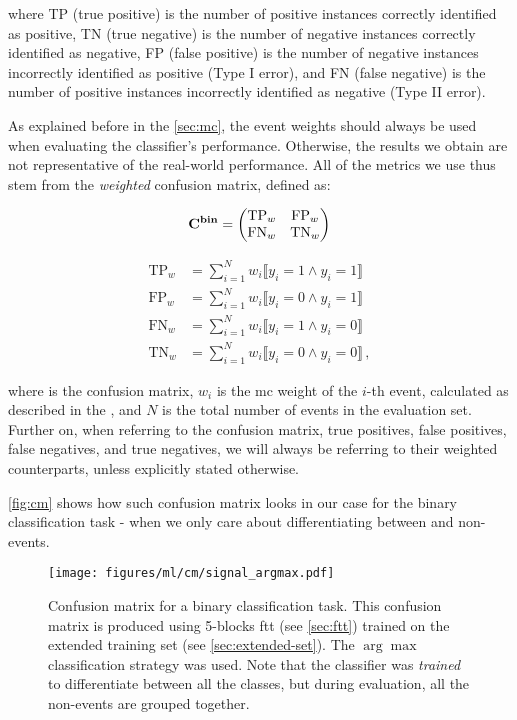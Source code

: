 where TP (true positive) is the number of positive instances correctly identified as positive, TN (true negative) is the
number of negative instances correctly identified as negative, FP (false positive) is the number of negative instances
incorrectly identified as positive (Type I error), and FN (false negative) is the number of positive instances
incorrectly identified as negative (Type II error).

As explained before in the \autoref{sec:mc}, the event weights should always be used when evaluating the classifier's
performance. Otherwise, the results we obtain are not representative of the real-world performance. All of the metrics
we use thus stem from the \emph{weighted} confusion matrix, defined as:

\begin{equation}
    \mathbf{C}^{\textbf{bin}} = \begin{pmatrix}
        \text{TP}_{w} & \text{FP}_{w} \\
        \text{FN}_{w} & \text{TN}_{w} \\
    \end{pmatrix}
\end{equation}

\begin{align}
    \text{TP}_{w} & = \sum_{i=1}^{N} w_i \llbracket y_i = 1 \land \hat{y}_i = 1 \rrbracket    \\
    \text{FP}_{w} & = \sum_{i=1}^{N} w_i \llbracket y_i = 0 \land \hat{y}_i = 1 \rrbracket    \\
    \text{FN}_{w} & = \sum_{i=1}^{N} w_i \llbracket y_i = 1 \land \hat{y}_i = 0 \rrbracket    \\
    \text{TN}_{w} & = \sum_{i=1}^{N} w_i \llbracket y_i = 0 \land \hat{y}_i = 0 \rrbracket\,,
\end{align}

where \Cbin is the confusion matrix, $w_i$ is the \gls{mc} weight of the $i$-th event, calculated as described in the
, and $N$ is the total number of events in the evaluation set. Further on, when referring to
the confusion matrix, true positives, false positives, false negatives, and true negatives, we will always be referring
to their weighted counterparts, unless explicitly stated otherwise.

\autoref{fig:cm} shows how such confusion matrix looks in our case for the binary classification task - when we only
care about differentiating between \tth and non-\tth events.

\begin{figure}[htb]
    \centering
    \texttt{[image: figures/ml/cm/signal\_argmax.pdf]}
    \caption[Confusion matrix for a binary classification task]
    {Confusion matrix for a binary classification task. This confusion matrix is produced using 5-blocks
        \gls{ftt} (see \autoref{sec:ftt}) trained on the extended training set (see \autoref{sec:extended-set}). The
        $\arg\max$ classification strategy was used.  Note that the classifier was \emph{trained} to differentiate
        between all the classes, but during evaluation, all the non-\tth events are grouped together.}
    \label{fig:cm}
\end{figure}

